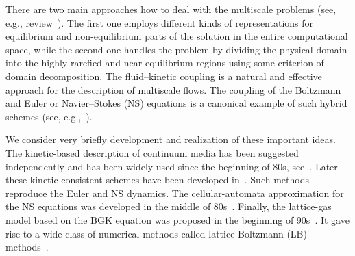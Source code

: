 \documentclass{elsarticle} %
\begin{document}
There are two main approaches how to deal with the multiscale problems (see, e.g., review~\cite{Dimarco2014}).
The first one employs different kinds of representations for equilibrium and non-equilibrium parts of the solution
in the entire computational space, while the second one handles the problem by dividing the physical domain
into the highly rarefied and near-equilibrium regions using some criterion of domain decomposition.
The fluid--kinetic coupling is a natural and effective approach for the description of multiscale flows.
The coupling of the Boltzmann and Euler or Navier--Stokes (NS) equations
is a canonical example of such hybrid schemes (see, e.g.,~\cite{Bourgat1996, Tallec1997}).

We consider very briefly development and realization of these important ideas.
The kinetic-based description of continuum media has been suggested independently and has been widely used since the beginning of 80s,
see~\cite{Potkin1975, Pullin1980, Reitz1981, Aristov1983}. Later these kinetic-consistent schemes have been developed
in~\cite{Elizarova1985, Deshpande1986, Prendergast1993, Chou1997, Ohwada2004Xu, Ohwada2004Kobayashi, Ohwada2006}.
Such methods reproduce the Euler and NS dynamics.
The cellular-automata approximation for the NS equations was developed in the middle of 80s~\cite{Frisch1986}.
Finally, the lattice-gas model based on the BGK equation was proposed in the beginning of 90s~\cite{Qian1992}.
It gave rise to a wide class of numerical methods called lattice-Boltzmann (LB) methods~\cite{Higuera1989,Benzi1992,Succi2001}.
\end{document}
